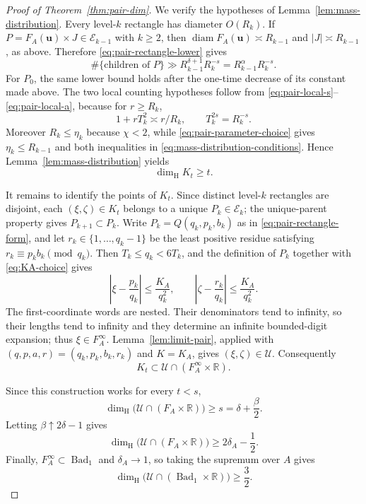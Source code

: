 \documentclass[11pt]{amsart}
\newcommand{\R}{\mathbb R}
\newcommand{\Bad}{\operatorname{Bad}}
\newcommand{\diam}{\operatorname{diam}}
\newcommand{\dimH}{\dim_{\mathrm H}}
\begin{document}
\begin{proof}[Proof of Theorem~\ref{thm:pair-dim}]
We verify the hypotheses of Lemma~\ref{lem:mass-distribution}.  Every
level-$k$ rectangle has diameter $O(R_k)$.  If $P=F_A(\mathbf{u})\times J\in\mathcal E_{k-1}$ with $k\ge2$, then
$\diam F_A(\mathbf{u})\asymp R_{k-1}$ and $|J|\asymp R_{k-1}$, as above.  Therefore
\eqref{eq:pair-rectangle-lower} gives
$$
 \#\{\text{children of }P\}
 \gg R_{k-1}^{\delta+1}R_k^{-s}
 =R_{k-1}^{\alpha}R_k^{-s}.
$$
For $P_0$, the same lower bound holds after the one-time decrease of its
constant made above.  The
two local counting hypotheses follow from
\eqref{eq:pair-local-s}--\eqref{eq:pair-local-a}, because for $r\ge R_k$,
$$
 1+rT_k^2\asymp r/R_k,
 \qquad T_k^{2s}=R_k^{-s}.
$$
Moreover $R_k\le\eta_k$ because $\chi<2$, while
\eqref{eq:pair-parameter-choice} gives $\eta_k\le R_{k-1}$ and both
inequalities in \eqref{eq:mass-distribution-conditions}.  Hence
Lemma~\ref{lem:mass-distribution} yields
$$
 \dimH K_t\ge t.
$$

It remains to identify the points of $K_t$.  Since distinct level-$k$
rectangles are disjoint, each $(\xi,\zeta)\in K_t$ belongs to a unique
$P_k\in\mathcal E_k$; the unique-parent property gives
$P_{k+1}\subset P_k$.  Write $P_k=Q(q_k,p_k,b_k)$ as in
\eqref{eq:pair-rectangle-form}, and let $r_k\in\{1,\ldots,q_k-1\}$ be the
least positive residue satisfying $r_k\equiv p_kb_k\pmod{q_k}$.  Then $T_k\le q_k<6T_k$, and the definition of $P_k$ together with
\eqref{eq:KA-choice} gives
\begin{equation}\label{eq:pair-limit-approx}
 \left|\xi-\frac{p_k}{q_k}\right|\le\frac{K_A}{q_k^2},
 \qquad
 \left|\zeta-\frac{r_k}{q_k}\right|\le\frac{K_A}{q_k^2}.
\end{equation}
The first-coordinate words are nested.  Their denominators tend to infinity,
so their lengths tend to infinity and they determine an infinite bounded-digit
expansion; thus $\xi\in F_A^\infty$.  Lemma~\ref{lem:limit-pair}, applied with $(q,p,a,r)=(q_k,p_k,b_k,r_k)$
and $K=K_A$, gives $(\xi,\zeta)\in \mathcal U$.  Consequently
$$
 K_t\subset \mathcal U\cap(F_A^\infty\times\R).
$$

Since this construction works for every $t<s$,
$$
 \dimH\bigl(\mathcal U\cap(F_A\times\R)\bigr)\ge s
 =\delta+\frac\beta2.
$$
Letting $\beta\uparrow2\delta-1$ gives
$$
 \dimH\bigl(\mathcal U\cap(F_A\times\R)\bigr)
 \ge2\delta_A-\frac12.
$$
Finally, $F_A^\infty\subset\Bad_1$ and $\delta_A\to1$, so taking the supremum
over $A$ gives
$$
 \dimH\bigl(\mathcal U\cap(\Bad_1\times\R)\bigr)\ge\frac32.
$$
\end{proof}
\end{document}
